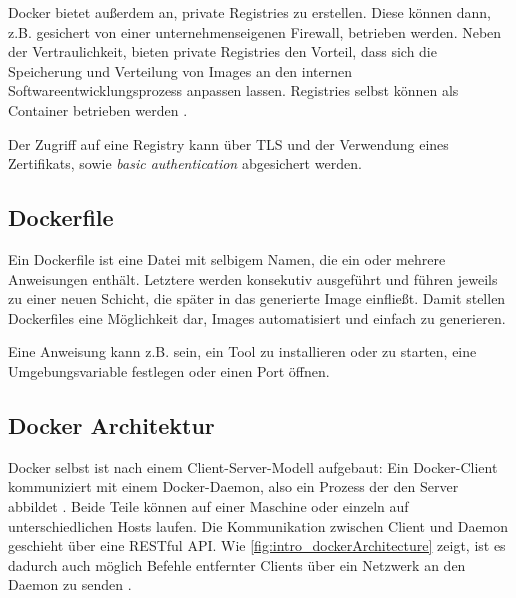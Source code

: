 \documentclass[../main.tex]{subfiles}
\begin{document}




      Docker bietet außerdem an, private Registries zu erstellen. Diese können dann, z.B. gesichert von einer unternehmenseigenen Firewall, betrieben werden. Neben der Vertraulichkeit, bieten private Registries den Vorteil, dass sich die Speicherung und Verteilung von Images an den internen Softwareentwicklungsprozess anpassen lassen. Registries selbst können als Container betrieben werden \cite{dockerRegistry}.

      Der Zugriff auf eine Registry kann über TLS und der Verwendung eines Zertifikats, sowie \emph{basic authentication} abgesichert werden.
    \subsection{Dockerfile}
      Ein Dockerfile ist eine Datei mit selbigem Namen, die ein oder mehrere Anweisungen enthält. Letztere werden konsekutiv ausgeführt und führen jeweils zu einer neuen Schicht, die später in das generierte Image einfließt. Damit stellen Dockerfiles eine Möglichkeit dar, Images automatisiert und einfach zu generieren.

      Eine Anweisung kann z.B. sein, ein Tool zu installieren oder zu starten, eine Umgebungsvariable festlegen oder einen Port öffnen.



    \subsection{Docker Architektur}
      Docker selbst ist nach einem Client-Server-Modell aufgebaut: Ein Docker-Client kommuniziert mit einem Docker-Daemon, also ein Prozess der den Server abbildet \cite{dockerUnderstandingDocker}. Beide Teile können auf einer Maschine oder einzeln auf unterschiedlichen Hosts laufen. Die Kommunikation zwischen Client und Daemon geschieht über eine RESTful API. Wie \fig \ref{fig:intro_dockerArchitecture} zeigt, ist es dadurch auch möglich Befehle entfernter Clients über ein Netzwerk an den Daemon zu senden \cite{dockerSec1}.
\end{document}
